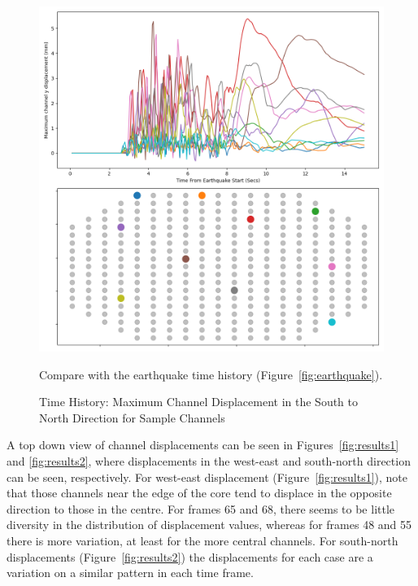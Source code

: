 \begin{figure}[p]
	\centering
	\includegraphics[scale=0.45]{Figures/time_history_y.png}
	\caption{Time History: Maximum Channel Displacement in the South to North Direction for Sample Channels } {Compare with the earthquake time history (Figure~\ref{fig:earthquake}).}
	\label{fig:time_history_2}
\end{figure}

\noindent
A top down view of channel displacements can be seen in Figures~\ref{fig:results1}
and \ref{fig:results2}, where displacements in the west-east and south-north direction can be seen, respectively. For west-east displacement (Figure~\ref{fig:results1}), note that those channels near the edge of the core tend to displace in the opposite direction to those in the centre. For frames 65 and 68, there seems to be little diversity in the distribution of displacement values, whereas for frames 48 and 55 there is more variation, at least for the more central channels. For south-north displacements (Figure~\ref{fig:results2}) the displacements for each case are a variation on a similar pattern in each time frame.
\\

